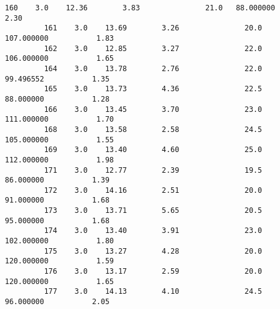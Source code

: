 \documentclass[11pt]{article}
\begin{document}
\begin{Verbatim}[commandchars=\\\{\}]
         160    3.0    12.36        3.83               21.0   88.000000           2.30   
         161    3.0    13.69        3.26               20.0  107.000000           1.83   
         162    3.0    12.85        3.27               22.0  106.000000           1.65   
         164    3.0    13.78        2.76               22.0   99.496552           1.35   
         165    3.0    13.73        4.36               22.5   88.000000           1.28   
         166    3.0    13.45        3.70               23.0  111.000000           1.70   
         168    3.0    13.58        2.58               24.5  105.000000           1.55   
         169    3.0    13.40        4.60               25.0  112.000000           1.98   
         171    3.0    12.77        2.39               19.5   86.000000           1.39   
         172    3.0    14.16        2.51               20.0   91.000000           1.68   
         173    3.0    13.71        5.65               20.5   95.000000           1.68   
         174    3.0    13.40        3.91               23.0  102.000000           1.80   
         175    3.0    13.27        4.28               20.0  120.000000           1.59   
         176    3.0    13.17        2.59               20.0  120.000000           1.65   
         177    3.0    14.13        4.10               24.5   96.000000           2.05   
         

\end{Verbatim}
\end{document}
